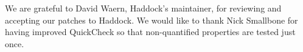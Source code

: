 \documentclass[preprint]{sigplanconf}
\begin{document}
\acks

We are grateful to David Waern, Haddock's maintainer, for reviewing and
accepting our patches to Haddock.
We would like to thank
Nick Smallbone for having improved QuickCheck so that
non-quantified properties are tested just once.




\end{document}
